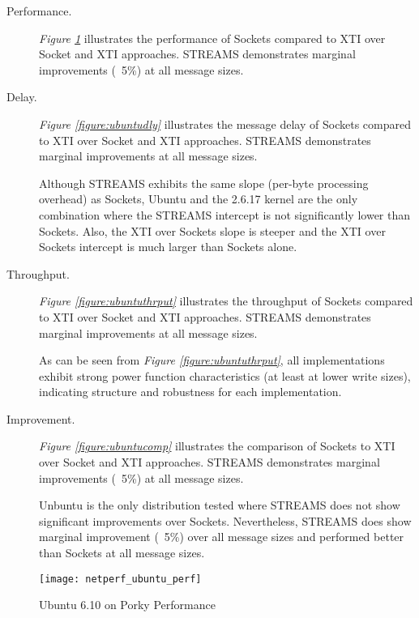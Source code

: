 \documentclass[letterpaper,final,notitlepage,twocolumn,10pt,twoside]{article}
\begin{document}
\begin{description}

\item[Performance.]

\textit{Figure \ref{figure:ubuntuperf}}
illustrates the performance of Sockets compared to XTI over Socket and XTI
approaches.  STREAMS demonstrates marginal improvements (~5\%) at all message
sizes.

\item[Delay.]

\textit{Figure \ref{figure:ubuntudly}}
illustrates the message delay of Sockets compared to XTI over Socket and XTI
approaches.  STREAMS demonstrates marginal improvements at all message sizes.

Although STREAMS exhibits the same slope (per-byte processing overhead) as
Sockets, Ubuntu and the 2.6.17 kernel are the only combination where the
STREAMS intercept is not significantly lower than Sockets.  Also, the XTI over
Sockets slope is steeper and the XTI over Sockets intercept is much larger
than Sockets alone.

\item[Throughput.]

\textit{Figure \ref{figure:ubuntuthrput}}
illustrates the throughput of Sockets compared to XTI over Socket and XTI
approaches.  STREAMS demonstrates marginal improvements at all message
sizes.

As can be seen from \textit{Figure \ref{figure:ubuntuthrput}}, all
implementations exhibit strong power function characteristics (at least at
lower write sizes), indicating structure and robustness for each
implementation.

\item[Improvement.]

\textit{Figure \ref{figure:ubuntucomp}}
illustrates the comparison of Sockets to XTI over Socket and XTI approaches.
STREAMS demonstrates marginal improvements (~5\%) at all message sizes.

Unbuntu is the only distribution tested where STREAMS does not show
significant improvements over Sockets.  Nevertheless, STREAMS does show
marginal improvement (~5\%) over all message sizes and performed better than
Sockets at all message sizes.

\end{description}

\begin{figure}[p]
\center\texttt{[image: netperf\_ubuntu\_perf]}
\caption[Ubuntu 6.10 on Porky Performance]{Ubuntu 6.10 on Porky Performance}
\label{figure:ubuntuperf}
\end{figure}
\end{document}
